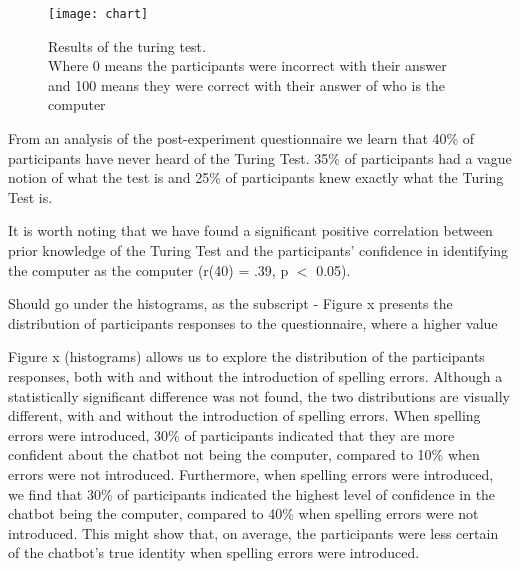 \begin{figure}[ht]
   \begin{center}
      \texttt{[image: chart]}
   \end{center}
   \caption{Results of the turing test.\\ Where 0 means the participants were incorrect with their answer and 100 means they were correct with their answer of who is the computer}
\end{figure}

From an analysis of the post-experiment questionnaire we learn that 40\% of participants have never heard of the Turing Test. 35\% of participants had a vague notion of what the test is and 25\% of participants knew exactly what the Turing Test is.

It is worth noting that we have found a significant positive correlation between prior knowledge of the Turing Test and the participants' confidence in identifying the computer as the computer (r(40) = .39, p $<$ 0.05).

Should go under the histograms, as the subscript - Figure x presents the distribution of participants responses to the questionnaire, where a higher value

Figure x (histograms) allows us to explore the distribution of the participants responses, both with and without the introduction of spelling errors. Although a statistically significant difference was not found, the two distributions are visually different, with and without the introduction of spelling errors. When spelling errors were introduced, 30\% of participants indicated that they are more confident about the chatbot not being the computer, compared to 10\% when errors were not introduced. Furthermore, when spelling errors were introduced, we find that 30\% of participants indicated the highest level of confidence in the chatbot being the computer, compared to 40\% when spelling errors were not introduced. This might show that, on average, the participants were less certain of the chatbot's true identity when spelling errors were introduced.

